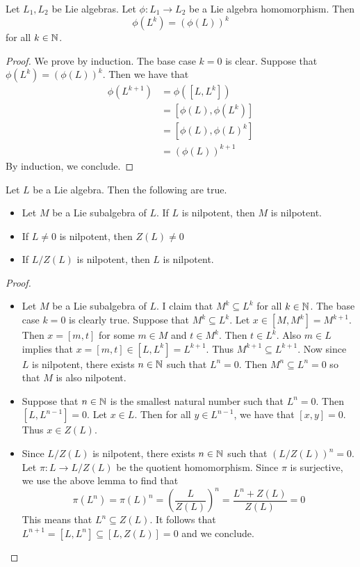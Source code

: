 \documentclass[a4paper]{article}
\begin{document}
\begin{lmm}{}{} Let $L_1,L_2$ be Lie algebras. Let $\phi:L_1\to L_2$ be a Lie algebra homomorphism. Then $$\phi(L^k)=(\phi(L))^k$$ for all $k\in\mathbb{N}$. \tcbline
\begin{proof}
We prove by induction. The base case $k=0$ is clear. Suppose that $\phi(L^k)=(\phi(L))^k$. Then we have that 
\begin{align*}
\phi(L^{k+1})&=\phi([L,L^k])\\
&=[\phi(L),\phi(L^k)]\\
&=[\phi(L),\phi(L)^k]\\
&=(\phi(L))^{k+1}
\end{align*}
By induction, we conclude. 
\end{proof}
\end{lmm}

\begin{lmm}{}{} Let $L$ be a Lie algebra. Then the following are true. 
\begin{itemize}
\item Let $M$ be a Lie subalgebra of $L$. If $L$ is nilpotent, then $M$ is nilpotent. 
\item If $L\neq 0$ is nilpotent, then $Z(L)\neq 0$
\item If $L/Z(L)$ is nilpotent, then $L$ is nilpotent. 
\end{itemize} \tcbline
\begin{proof}~\\
\begin{itemize}
\item Let $M$ be a Lie subalgebra of $L$. I claim that $M^k\subseteq L^k$ for all $k\in\mathbb{N}$. The base case $k=0$ is clearly true. Suppose that $M^k\subseteq L^k$. Let $x\in[M,M^k]=M^{k+1}$. Then $x=[m,t]$ for some $m\in M$ and $t\in M^k$. Then $t\in L^k$. Also $m\in L$ implies that $x=[m,t]\in[L,L^k]=L^{k+1}$. Thus $M^{k+1}\subseteq L^{k+1}$. Now since $L$ is nilpotent, there exists $n\in\mathbb{N}$ such that $L^n=0$. Then $M^n\subseteq L^n=0$ so that $M$ is also nilpotent. 
\item Suppose that $n\in\mathbb{N}$ is the smallest natural number such that $L^n=0$. Then $[L,L^{n-1}]=0$. Let $x\in L$. Then for all $y\in L^{n-1}$, we have that $[x,y]=0$. Thus $x\in Z(L)$. 
\item Since $L/Z(L)$ is nilpotent, there exists $n\in\mathbb{N}$ such that $(L/Z(L))^n=0$. Let $\pi:L\to L/Z(L)$ be the quotient homomorphism. Since $\pi$ is surjective, we use the above lemma to find that $$\pi(L^n)=\pi(L)^n=\left(\frac{L}{Z(L)}\right)^n=\frac{L^n+Z(L)}{Z(L)}=0$$ This means that $L^n\subseteq Z(L)$. It follows that $L^{n+1}=[L,L^n]\subseteq[L,Z(L)]=0$ and we conclude. 
\end{itemize}
\end{proof}
\end{lmm}
\end{document}
